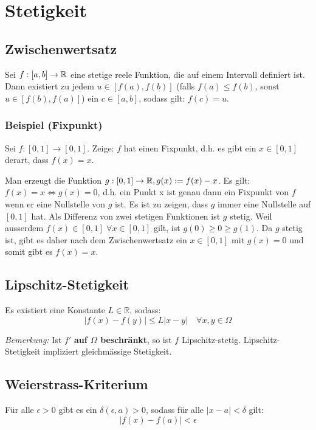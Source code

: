 

\section{Stetigkeit}

\subsection{Zwischenwertsatz}
Sei $f: [a,b] \to \mathbb{R}$ eine stetige reele Funktion, die auf einem Intervall
definiert ist. Dann existiert zu jedem $u \in [f(a), f(b)]$ (falls $f(a) \leq
f(b)$, sonst $u \in [f(b), f(a)]$) ein $c \in [a,b]$, sodass gilt: $f(c)= u$.

\subsubsection{Beispiel (Fixpunkt)}
Sei $f: [0,1] \to [0,1]$. Zeige: $f$ hat einen Fixpunkt, d.h. es gibt ein $x
\in [0,1]$ derart, dass $f(x) = x$.

Man erzeugt die Funktion $g: [0,1] \to \mathbb{R}, g(x) := f(x) - x$. Es gilt: $f(x) =
x \Leftrightarrow g(x) = 0$, d.h. ein Punkt x ist genau dann ein Fixpunkt von
$f$ wenn er eine Nullstelle von $g$ ist. Es ist zu zeigen, dass $g$ immer eine
Nullstelle auf $[0,1]$ hat. Als Differenz von zwei stetigen Funktionen ist $g$
stetig. Weil ausserdem $f(x) \in [0,1] \; \forall x \in [0,1]$ gilt, ist $g(0)
\geq 0 \geq g(1)$. Da $g$ stetig ist, gibt es daher nach dem Zwischenwertsatz
ein $x \in [0,1]$ mit $g(x) = 0$ und somit gibt es $f(x) = x$.


\subsection{Lipschitz-Stetigkeit}
Es existiert eine Konstante $L\in \mathbb{R}$, sodass:
\begin{equation*}
	|f(x)-f(y)|\leq L|x-y| \quad \forall x,y \in \Omega
\end{equation*}

\emph{Bemerkung:} Ist $f'$ \textbf{auf $\Omega$ beschr{\"a}nkt}, so ist $f$ Lipschitz-stetig. Lipschitz-Stetigkeit impliziert gleichm{\"a}ssige Stetigkeit.

\subsection{Weierstrass-Kriterium}
F{\"u}r alle $\epsilon > 0$ gibt es ein $\delta(\epsilon, a) >0$, sodass f{\"u}r alle $|x-a|<\delta$ gilt:
\begin{equation*}
	|f(x) -f(a)|<\epsilon
\end{equation*}

